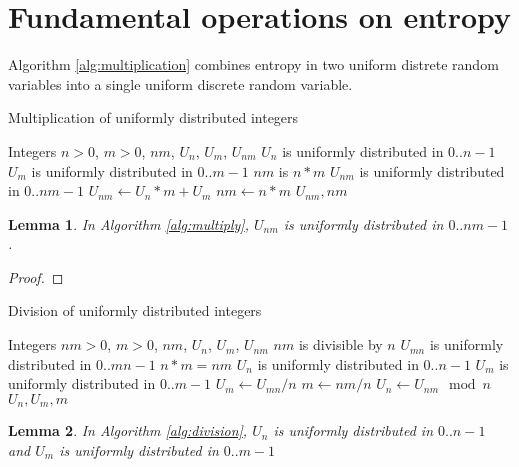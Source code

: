 \documentclass[12pt]{article}
\newtheorem{lemma}{Lemma}
\begin{document}
\section{Fundamental operations on entropy}

Algorithm \ref{alg:multiplication} combines entropy in two uniform distrete random variables into a single uniform discrete random variable.

\begin{algorithm}
\caption{Multiplication of uniformly distributed integers}
\label{alg:multiplication}
\begin{algorithmic}[1]
    \Require Integers $n>0$, $m>0$, $nm$, $U_n$, $U_m$, $U_{nm}$
    \Require $U_n$ is uniformly distributed in $0..n-1$
    \Require $U_m$ is uniformly distributed in $0..m-1$
\Ensure $nm$ is $n * m$
\Ensure $U_{nm}$ is uniformly distributed in $0..nm-1$
  \State $U_{nm} \gets U_n * m + U_m$
  \State $nm \gets n * m$
  \State \Return $U_{nm}, nm$
\EndProcedure
\end{algorithmic}
\end{algorithm}

\begin{lemma}
In Algorithm \ref{alg:multiply}, $U_{nm}$ is uniformly distributed in $0..nm-1$.
\end{lemma}

\begin{proof}
\end{proof}

\begin{algorithm}
\caption{Division of uniformly distributed integers}
\label{alg:division}
\begin{algorithmic}[1]
    \Require Integers $nm>0$, $m>0$, $nm$, $U_n$, $U_m$, $U_{nm}$
    \Require $nm$ is divisible by $n$
    \Require $U_{mn}$ is uniformly distributed in $0..mn-1$
\Ensure $n * m = nm$
\Ensure $U_{n}$ is uniformly distributed in $0..n-1$
\Ensure $U_{m}$ is uniformly distributed in $0..m-1$
  \State $U_m \gets U_{mn} / n$
  \State $m \gets nm / n$
  \State $U_{n} \gets U_{nm} \mod n$
  \State \Return $U_n, U_m, m$
\EndProcedure
\end{algorithmic}
\end{algorithm}

\begin{lemma}
In Algorithm \ref{alg:division}, $U_n$ is uniformly distributed in $0..n-1$ and $U_m$ is uniformly distributed in $0..m-1$
\end{lemma}
\end{document}
